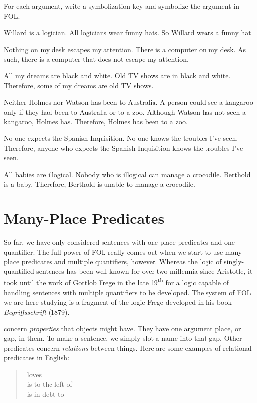 \problempart
\label{pr.FOLarguments}
For each argument, write a symbolization key and symbolize the argument in FOL.
\begin{earg}
\item Willard is a logician. All logicians wear funny hats. So Willard wears a funny hat
\item Nothing on my desk escapes my attention. There is a computer on my desk. As such, there is a computer that does not escape my attention.
\item All my dreams are black and white. Old TV shows are in black and white. Therefore, some of my dreams are old TV shows.
\item Neither Holmes nor Watson has been to Australia. A person could see a kangaroo only if they had been to Australia or to a zoo. Although Watson has not seen a kangaroo, Holmes has. Therefore, Holmes has been to a zoo.
\item No one expects the Spanish Inquisition. No one knows the troubles I've seen. Therefore, anyone who expects the Spanish Inquisition knows the troubles I've seen.
\item All babies are illogical. Nobody who is illogical can manage a crocodile. Berthold is a baby. Therefore, Berthold is unable to manage a crocodile.
\end{earg}






\section{Many-Place Predicates}

So far, we have only considered sentences with one-place predicates and one quantifier. The full power of FOL really comes out when we start to use many-place predicates and multiple quantifiers, however. Whereas the logic of singly-quantified sentences has been well known for over two millennia since Aristotle, it took until the work of Gottlob Frege in the late 19\textsuperscript{th} for a logic capable of handling sentences with multiple quantifiers to be developed.  The system of FOL we are here studying is a fragment of the logic Frege developed in his book \emph{Begriffsschrift} (1879).


 concern \emph{properties} that objects might have. They have one argument place, or gap, in them.  To make a sentence, we simply slot a name into that gap.  Other predicates concern \emph{relations} between things. Here are some examples of relational predicates in English:
	\begin{quote}
		\blank\ loves \blank\\
		\blank\ is to the left of \blank\\
		\blank\ is in debt to \blank
	\end{quote}

